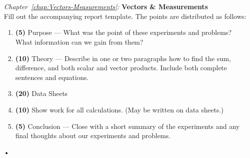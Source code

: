 \documentclass[main.tex]{subfiles}
\begin{document}
\begin{samepage}
\hrulefill\\ \\
\emph{Chapter~\ref{chap:Vectors-Measurements}:} \textbf{Vectors \& Measurements}\\
Fill out the accompanying report template. The points are distributed as follows:
\begin{enumerate}
\item
\textbf{(5)} Purpose ---  What was the point of these experiments and problems? What information can we gain from them?
\item
\textbf{(10)} Theory --- Describe in one or two paragraphs how to find the sum, difference, and both scalar and vector products. Include both complete sentences and equations.
\item
\textbf{(20)} Data Sheets
\item
\textbf{(10)} Show work for all calculations. (May be written on data sheets.)
\item
\textbf{(5)} Conclusion --- Close with a short summary of the experiments and any final thoughts about our experiments and problems.
\end{enumerate}•
\end{samepage}
\end{document}

